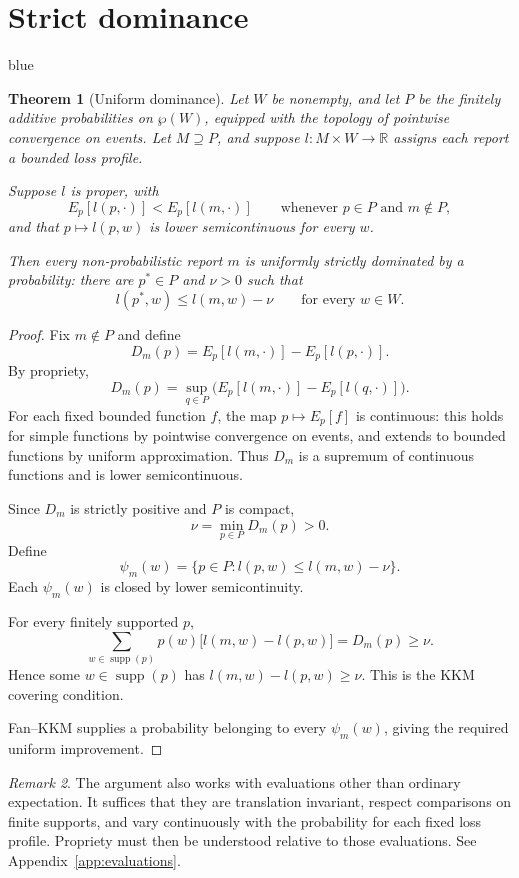 \documentclass[11pt]{article}
\newtheorem{theorem}{Theorem}[section]
\theoremstyle{definition}
\theoremstyle{remark}
\newtheorem{remark}[theorem]{Remark}
\newcommand{\supp}{\operatorname{supp}}
\newenvironment{AIwritten}{\begin{color}{blue}}{\end{color}}
\begin{document}
\section{Strict dominance}
\label{appendix:strdom}
\begin{AIwritten}
	
	
	\begin{theorem}[Uniform dominance]
		Let $W$ be nonempty, and let $P$ be the finitely
		additive probabilities on $\wp(W)$, equipped with
		the topology of pointwise convergence on events.
		Let $M\supseteq P$, and suppose
		$l\colon M\times W\to\mathbb R$ assigns each
		report a bounded loss profile.
		
		Suppose $l$ is proper, with
		\[
		E_p[l(p,\cdot)]<E_p[l(m,\cdot)]
		\qquad
		\text{whenever }p\in P\text{ and }m\notin P,
		\]
		and that $p\mapsto l(p,w)$ is lower
		semicontinuous for every $w$.
		
		Then every non-probabilistic report $m$ is
		uniformly strictly dominated by a probability:
		there are $p^*\in P$ and $\nu>0$ such that
		\[
		l(p^*,w)\le l(m,w)-\nu
		\qquad\text{for every }w\in W.
		\]
	\end{theorem}
	
	
	\begin{proof}
		Fix $m\notin P$ and define
		\[
		D_m(p)=E_p[l(m,\cdot)]-E_p[l(p,\cdot)].
		\]
		By propriety,
		\[
		D_m(p)=
		\sup_{q\in P}
		\bigl(E_p[l(m,\cdot)]-E_p[l(q,\cdot)]\bigr).
		\]
		For each fixed bounded function $f$, the map
		$p\mapsto E_p[f]$ is continuous: this holds for
		simple functions by pointwise convergence on events,
		and extends to bounded functions by uniform
		approximation. Thus $D_m$ is a supremum of
		continuous functions and is lower semicontinuous.
		
		Since $D_m$ is strictly positive and $P$ is compact,
		\[
		\nu=\min_{p\in P}D_m(p)>0.
		\]
		Define
		\[
		\psi_m(w)=
		\{p\in P:l(p,w)\le l(m,w)-\nu\}.
		\]
		Each $\psi_m(w)$ is closed by lower semicontinuity.
		
		For every finitely supported $p$,
		\[
		\sum_{w\in\supp(p)}
		p(w)\bigl[l(m,w)-l(p,w)\bigr]
		=D_m(p)\ge\nu.
		\]
		Hence some $w\in\supp(p)$ has
		$l(m,w)-l(p,w)\ge\nu$.
		This is the KKM covering condition.
		
		Fan--KKM supplies a probability belonging to every
		$\psi_m(w)$, giving the required uniform improvement.
	\end{proof}
	
	\begin{remark}
		The argument also works with evaluations other
		than ordinary expectation. It suffices that they
		are translation invariant, respect comparisons
		on finite supports, and vary continuously with
		the probability for each fixed loss profile.
		Propriety must then be understood relative to
		those evaluations. See Appendix~\ref{app:evaluations}.
	\end{remark}
	

\end{AIwritten}
\end{document}
